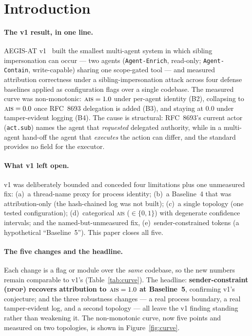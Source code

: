 \documentclass[11pt]{article}
\newcommand{\ais}{\textsc{ais}}
\newcommand{\code}[1]{\texttt{#1}}
\newcommand{\actsub}{\code{act.sub}}
\newcommand{\dpop}{\textsc{dpop}}
\begin{document}
\tableofcontents

\section{Introduction}

\paragraph{The v1 result, in one line.}
AEGIS-AT v1~\cite{aegisv1} built the smallest multi-agent system in which
sibling impersonation can occur --- two agents (\code{Agent-Enrich},
read-only; \code{Agent-Contain}, write-capable) sharing one scope-gated
tool --- and measured attribution correctness under a sibling-impersonation
attack across four defense baselines applied as configuration flags over a
single codebase. The measured curve was non-monotonic: $\ais{}=1.0$ under
per-agent identity (B2), collapsing to $\ais{}=0.0$ once RFC~8693
delegation is added (B3), and staying at $0.0$ under tamper-evident logging
(B4). The cause is structural: RFC~8693's current actor (\actsub{}) names
the agent that \emph{requested} delegated authority, while in a multi-agent
hand-off the agent that \emph{executes} the action can differ, and the
standard provides no field for the executor.

\paragraph{What v1 left open.}
v1 was deliberately bounded and conceded four limitations plus one unmeasured
fix: (a)~a thread-name proxy for process identity; (b)~a Baseline~4 that was
attribution-only (the hash-chained log was not built); (c)~a single
topology (one tested configuration); (d)~categorical \ais{} ($\in\{0,1\}$) with degenerate
confidence intervals; and the named-but-unmeasured fix, (e)~sender-constrained
tokens (a hypothetical ``Baseline~5''). This paper closes all five.

\paragraph{The five changes and the headline.}
Each change is a flag or module over the \emph{same} codebase, so the new
numbers remain comparable to v1's (Table~\ref{tab:curve}). The headline:
\textbf{sender-constraint (\dpop{}) recovers attribution to $\ais{}=1.0$ at
Baseline~5}, confirming v1's conjecture; and the three robustness changes ---
a real process boundary, a real tamper-evident log, and a second topology ---
all leave the v1 finding standing rather than weakening it. The non-monotonic
curve, now five points and measured on two topologies, is shown in
Figure~\ref{fig:curve}.
\end{document}
